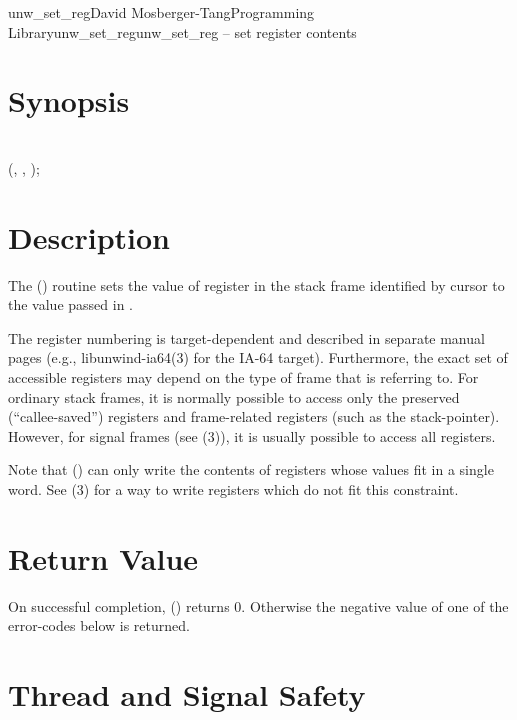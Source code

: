 \documentclass{article}
\begin{document}
\begin{Name}{3}{unw\_set\_reg}{David Mosberger-Tang}{Programming Library}{unw\_set\_reg}unw\_set\_reg -- set register contents
\end{Name}

\section{Synopsis}

\\

 (,  ,  );\\

\section{Description}

The () routine sets the value of register
 in the stack frame identified by cursor  to the
value passed in .

The register numbering is target-dependent and described in separate
manual pages (e.g., libunwind-ia64(3) for the IA-64 target).
Furthermore, the exact set of accessible registers may depend on the
type of frame that  is referring to.  For ordinary stack
frames, it is normally possible to access only the preserved
(``callee-saved'') registers and frame-related registers (such as the
stack-pointer).  However, for signal frames (see
(3)), it is usually possible to access
all registers.

Note that () can only write the contents of
registers whose values fit in a single word.  See
(3) for a way to write registers which do not
fit this constraint.

\section{Return Value}

On successful completion, () returns 0.
Otherwise the negative value of one of the error-codes below is
returned.

\section{Thread and Signal Safety}
\end{document}
